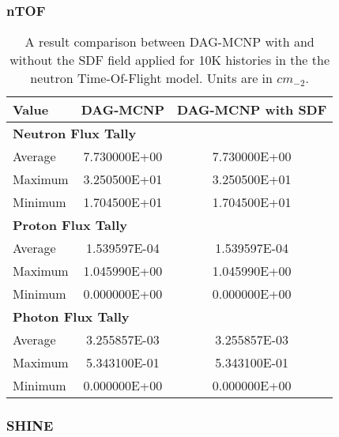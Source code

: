 \subsubsection{nTOF}

\begin{table}
  \small
  \begin{center}
    \begin{tabular}{lcc}
          \toprule
          Value   & DAG-MCNP     & DAG-MCNP with SDF      \\
          \toprule
          \multicolumn{3}{l}{\textbf{Neutron Flux Tally}} \\
          Average & 7.730000E+00 & 7.730000E+00           \\
          Maximum & 3.250500E+01 & 3.250500E+01           \\
          Minimum & 1.704500E+01 & 1.704500E+01           \\
          \multicolumn{3}{l}{\textbf{Proton Flux Tally}}  \\
          Average & 1.539597E-04 & 1.539597E-04           \\
          Maximum & 1.045990E+00 & 1.045990E+00           \\
          Minimum & 0.000000E+00 & 0.000000E+00           \\
          \multicolumn{3}{l}{\textbf{Photon Flux Tally}}  \\
          Average & 3.255857E-03 & 3.255857E-03           \\
          Maximum & 5.343100E-01 & 5.343100E-01           \\
          Minimum & 0.000000E+00 & 0.000000E+00           \\
          \bottomrule
    \end{tabular}
  \end{center}
  \caption[Results of flux mesh tallies for several particle types in the nTOF
    model.]{A result comparison between DAG-MCNP with and without the SDF field
    applied for 10K histories in the the neutron Time-Of-Flight model. Units are
    in $cm_{-2}$.}
\end{table}

\subsubsection{SHINE}

